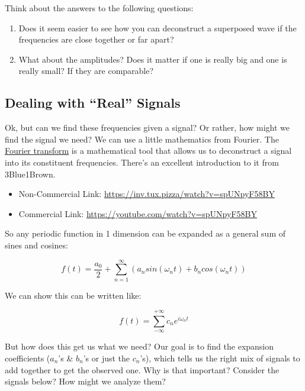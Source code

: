 Think about the answers to the following questions:

\begin{enumerate}
\def\labelenumi{\arabic{enumi}.}
\tightlist
\item
  Does it seem easier to see how you can deconstruct a superposed wave
  if the frequencies are close together or far apart?
\item
  What about the amplitudes? Does it matter if one is really big and one
  is really small? If they are comparable?
\end{enumerate}

\subsection{Dealing with ``Real''
Signals}\label{dealing-with-real-signals}

Ok, but can we find these frequencies given a signal? Or rather, how
might we find the signal we need? We can use a little mathematics from
Fourier. The
\href{https://en.wikipedia.org/wiki/Fourier_transform}{Fourier
transform} is a mathematical tool that allows us to deconstruct a signal
into its constituent frequencies. There's an excellent introduction to
it from 3Blue1Brown.

\href{https://inv.tux.pizza/watch?v=spUNpyF58BY}{\pandocbounded{\texttt{[image: https://markdown-videos-api.jorgenkh.no/youtube/spUNpyF58BY?width=720\&height=405]}}}

\begin{itemize}
\tightlist
\item
  Non-Commercial Link: \url{https://inv.tux.pizza/watch?v=spUNpyF58BY}
\item
  Commercial Link: \url{https://youtube.com/watch?v=spUNpyF58BY}
\end{itemize}

So any periodic function in 1 dimension can be expanded as a general sum
of sines and cosines:

\[f(t) = \dfrac{a_0}{2} + \sum_{n=1}^{\infty} \left(a_n sin(\omega_n t) + b_n cos(\omega_n t) \right)\]

We can show this can be written like:

\[f(t) = \sum_{-\infty}^{+\infty} c_n e^{i\omega_n t}\]

But how does this get us what we need? Our goal is to find the expansion
coefficients (\(a_n\)'s \& \(b_n\)'s or just the \(c_n\)'s), which tells
us the right mix of signals to add together to get the observed one. Why
is that important? Consider the signals below? How might we analyze
them?

